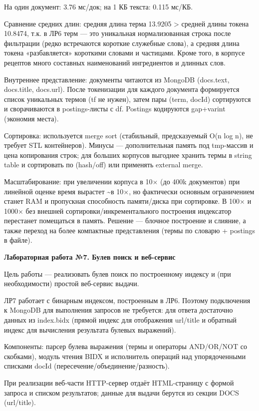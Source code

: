 \documentclass[12pt,a4paper]{article}
\begin{document}
На один документ: 3.76 мс/док; на 1 КБ текста: 0.115 мс/КБ.

Сравнение средних длин: средняя длина терма 13.9205 \textgreater{}
средней длины токена 10.8474, т.к. в ЛР6 терм --- это уникальная
нормализованная строка после фильтрации (редко встречаются короткие
служебные слова), а средняя длина токена «разбавляется» короткими
словами и частицами. Кроме того, в корпусе рецептов много составных
наименований ингредиентов и длинных слов.

Внутреннее представление: документы читаются из MongoDB (docs.text,
docs.title, docs.url). После токенизации для каждого документа
формируется список уникальных термов (tf не нужен), затем пары (term,
docId) сортируются и сворачиваются в postings-листы с df. Postings
кодируются gap+varint (экономия места).

Сортировка: используется merge sort (стабильный, предсказуемый O(n log
n), не требует STL контейнеров). Минусы --- дополнительная память под
tmp-массив и цена копирования строк; для больших корпусов выгоднее
хранить термы в string table и сортировать по (hash/off) или применять
external merge.

Масштабирование: при увеличении корпуса в 10× (до 400k документов) при
линейной оценке время вырастет \textasciitilde в 10×, но фактически
основным ограничением станет RAM и пропускная способность памяти/диска
при сортировке. В 100× и 1000× без внешней сортировки/инкрементального
построения индексатор перестанет помещаться в память. Решение ---
блочное построение и слияние, а также переход на более компактные
представления (термы по словарю + postings в файле).

\textbf{Лабораторная работа №7. Булев поиск и веб-сервис}

Цель работы --- реализовать булев поиск по построенному индексу и (при
необходимости) простой веб-сервис выдачи.

ЛР7 работает с бинарным индексом, построенным в ЛР6. Поэтому подключения
к MongoDB для выполнения запросов не требуется: для ответа достаточно
данных из index.bidx (прямой индекс для отображения url/title и обратный
индекс для вычисления результата булевых выражений).

Компоненты: парсер булева выражения (термы и операторы AND/OR/NOT со
скобками), модуль чтения BIDX и исполнитель операций над упорядоченными
списками docId (пересечение/объединение/разность).

При реализации веб-части HTTP-сервер отдаёт HTML-страницу с формой
запроса и списком результатов; данные для выдачи берутся из секции DOCS
(url/title).
\end{document}
